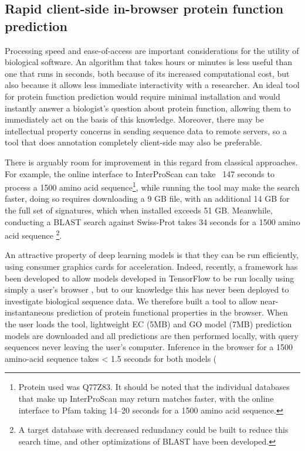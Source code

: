 \subsection*{Rapid client-side in-browser protein function prediction}
Processing speed and ease-of-access are important considerations for the utility of biological software. An algorithm that takes hours or minutes is less useful than one that runs in seconds, both because of its increased computational cost, but also because it allows less immediate interactivity with a researcher. An ideal tool for protein function prediction would require minimal installation and would instantly answer a biologist's question about protein function, allowing them to immediately act on the basis of this knowledge. Moreover, there may be intellectual property concerns in sending sequence data to remote servers, so a tool that does annotation completely client-side may also be preferable.

There is arguably room for improvement in this regard from classical approaches. For example, the online interface to InterProScan can take ~147 seconds to process a 1500 amino acid sequence\footnote{Protein used was Q77Z83. It should be noted that the individual databases that make up InterProScan may return matches faster, with the online interface to Pfam taking 14--20 seconds for a 1500 amino acid sequence.}, while running the tool may make the search faster, doing so requires downloading a 9 GB file, with an additional 14 GB for the full set of signatures, which when installed exceeds 51 GB. Meanwhile, conducting a BLAST search against Swiss-Prot takes 34 seconds for a 1500 amino acid sequence \footnote{A target database with decreased redundancy could be built to reduce this search time, and other optimizations of BLAST have been developed.}.

An attractive property of deep learning models is that they can be run efficiently, using consumer graphics cards for acceleration. Indeed, recently, a framework has been developed to allow models developed in TensorFlow to be run locally using simply a user's browser \citep{tfjs}, but to our knowledge this has never been deployed to investigate biological sequence data. We therefore built a tool to allow near-instantaneous prediction of protein functional properties in the browser. When the user loads the tool, lightweight EC (5MB) and GO model (7MB) prediction models are downloaded and all predictions are then performed locally, with query sequences never leaving the user's computer.  \DIFaddbegin {}\DIFaddend Inference in the browser for a 1500 amino-acid sequence takes < 1.5 seconds for both models (\DIFdelbegin %
\DIFdelend \DIFaddbegin {}


